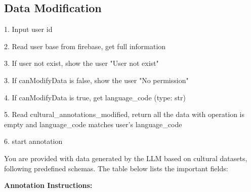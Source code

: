 \subsection{Data Modification}

1. Input user id

2. Read user base from firebase, get full information

3. If user not exist, show the user "User not exist"

3. If canModifyData is false, show the user "No permission"

4. If canModifyData is true, get language_code (type: str)

5. Read cultural_annotations_modified, return all the data with operation is empty and language_code matches user's language_code

6. start annotation

You are provided with data generated by the LLM based on cultural datasets, following predefined schemas. The table below lists the important fields:

\begin{table}[h]
\centering
{}
\caption{Schema fields in the provided dataset. These enforce consistency and structure across all data items.}
\label{tab:metadata_fields}
\end{table}

\textbf{Annotation Instructions:}

